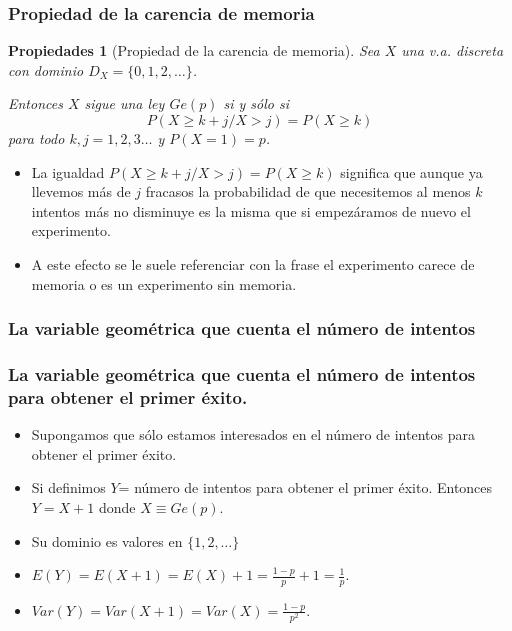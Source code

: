 \documentclass[handout]{beamer}\usepackage[]{graphicx}\usepackage[]{color}
\renewcommand{\emph}[1]{{\color{red}#1}}
\renewcommand{\geq}{\geqslant}
\theoremstyle{plain}
\newtheorem{prop}{Propiedades}
\theoremstyle{definition}
\begin{document}
\begin{frame}
\subsubsection{Propiedad de la carencia de memoria}
\begin{prop}[Propiedad de la carencia de memoria]
Sea $X$ una v.a. discreta con dominio $D_X=\{0,1,2,\ldots\}$.

Entonces $X$ sigue una ley $Ge(p)$ si y sólo si  
$$P(X\geq k+j/X> j)=P(X\geq k)$$
para todo $k,j=1,2,3\ldots$ y $P(X=1)=p$.
\end{prop}
\end{frame}

\begin{frame}

\begin{itemize}
\item  La igualdad $P(X\geq k+j/X> j)=P(X\geq k)$   significa que aunque ya llevemos más de $j$ fracasos la probabilidad de que necesitemos al menos $k$ intentos más no disminuye es la misma  que si empezáramos de nuevo el experimento. 
\item A este efecto se le suele referenciar con la frase   \emph{el experimento carece de memoria} o es un \emph{experimento sin memoria}.
\end{itemize}
\end{frame}

\begin{frame}

\subsubsection{La variable geométrica que cuenta el número de intentos}
\frametitle{La variable geométrica que cuenta el número de intentos  para obtener el
primer éxito.}

\begin{itemize}
\item Supongamos que sólo estamos interesados en el número de intentos para obtener el
primer éxito. 
\item Si definimos $Y$= número de  intentos para obtener el  primer éxito. Entonces $Y=X+1$  donde $X\equiv Ge(p)$.
\item Su dominio es
valores en $\{1,2,\ldots\}$ 
\item $E(Y)=E(X+1)=E(X)+1=\frac{1-p}{p}+1=\frac{1}{p}$.
\item $Var(Y)=Var(X+1)=Var(X)=\frac{1-p}{p^2}$.

\end{itemize}
\end{frame}
\end{document}
